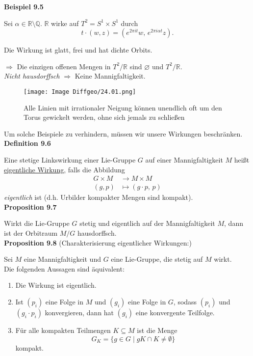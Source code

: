 \documentclass[fleqn, 12pt, letterpaper]{article}
\begin{document}
\textbf{Beispiel 9.5}

Sei \( \alpha \in \mathbb{R} \setminus \mathbb{Q} \). \(\mathbb{R}\) wirke auf \( T^2 = S^1 \times S^1 \) durch
\[
t \cdot (w, z) = \left( e^{2\pi i t} w,\, e^{2\pi i \alpha t} z \right).
\]

Die Wirkung ist glatt, frei und hat dichte Orbits.

\(\Rightarrow\) Die einzigen offenen Mengen in \( T^2 / \mathbb{R} \) sind \( \varnothing \) und \( T^2 / \mathbb{R} \). \\
\textit{Nicht hausdorffsch} \( \Rightarrow \) Keine Mannigfaltigkeit.
  \begin{figure}[H]
    \centering
    \texttt{[image: Image Diffgeo/24.01.png]}
    \caption{Alle Linien mit irrationaler Neigung können unendlich oft um den Torus gewickelt werden, ohne sich jemals zu schließen}
 \end{figure}

Um solche Beispiele zu verhindern, müssen wir unsere Wirkungen beschränken.\\

\textbf{Definition 9.6}

Eine stetige Links­wirkung einer Lie-Gruppe \( G \) auf einer Mannigfaltigkeit \( M \) heißt 
\underline{eigentliche Wirkung}, falls die Abbildung
\[
\begin{aligned}
G \times M &\longrightarrow M \times M \\
(g, p) &\longmapsto (g \cdot p,\, p)
\end{aligned}
\]
\emph{eigentlich} ist (d.h. Urbilder kompakter Mengen sind kompakt).\\

\textbf{Proposition 9.7}

Wirkt die Lie-Gruppe \( G \) stetig und eigentlich auf der Mannigfaltigkeit \( M \), 
dann ist der Orbitraum \( M / G \) hausdorffsch.\\


\textbf{Proposition 9.8} (Charakterisierung eigentlicher Wirkungen:)

Sei \( M \) eine Mannigfaltigkeit und \( G \) eine Lie-Gruppe, die stetig auf \( M \) wirkt. \\
Die folgenden Aussagen sind äquivalent:
\begin{enumerate}
  \item Die Wirkung ist eigentlich.
  \item Ist \( (p_i) \) eine Folge in \( M \) und \( (g_i) \) eine Folge in \( G \), sodass \( (p_i) \) und \( (g_i\cdot p_i) \) konvergieren, dann hat \( (g_i) \) eine konvergente Teilfolge.
  \item Für alle kompakten Teilmengen \( K \subseteq M \) ist die Menge
  \[
    G_K = \{ g \in G \mid g K \cap K \neq \emptyset \}
  \]
  kompakt.
\end{enumerate}
\end{document}
